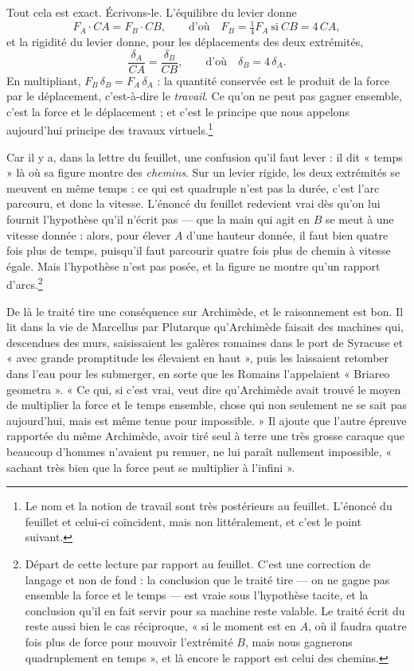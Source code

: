 \documentclass[11pt,a4paper]{article}
\begin{document}
Tout cela est exact. Écrivons-le. L'équilibre du levier donne
\[ F_A \cdot CA = F_B \cdot CB, \qquad \text{d'où} \quad F_B = \tfrac14 F_A \ \text{si} \ CB = 4\,CA, \]
et la rigidité du levier donne, pour les déplacements des deux extrémités,
\[ \frac{\delta_A}{CA} = \frac{\delta_B}{CB}, \qquad \text{d'où} \quad \delta_B = 4\,\delta_A. \]
En multipliant, $F_B\,\delta_B = F_A\,\delta_A$ : la quantité conservée est le
produit de la force par le déplacement, c'est-à-dire le \emph{travail}. Ce qu'on
ne peut pas gagner ensemble, c'est la force et le déplacement ; et c'est le
principe que nous appelons aujourd'hui principe des travaux
virtuels.\footnote{Le nom et la notion de travail sont très postérieurs au
feuillet. L'énoncé du feuillet et celui-ci coïncident, mais non littéralement, et
c'est le point suivant.}

Car il y a, dans la lettre du feuillet, une confusion qu'il faut lever : il dit
« temps » là où sa figure montre des \emph{chemins}. Sur un levier rigide, les
deux extrémités se meuvent en même temps : ce qui est quadruple n'est pas la
durée, c'est l'arc parcouru, et donc la vitesse. L'énoncé du feuillet redevient
vrai dès qu'on lui fournit l'hypothèse qu'il n'écrit pas — que la main qui agit
en $B$ se meut à une vitesse donnée : alors, pour élever $A$ d'une hauteur
donnée, il faut bien quatre fois plus de temps, puisqu'il faut parcourir quatre
fois plus de chemin à vitesse égale. Mais l'hypothèse n'est pas posée, et la
figure ne montre qu'un rapport d'arcs.\footnote{Départ de cette lecture par
rapport au feuillet. C'est une correction de langage et non de fond : la
conclusion que le traité tire — on ne gagne pas ensemble la force et le temps —
est vraie sous l'hypothèse tacite, et la conclusion qu'il en fait servir pour sa
machine reste valable. Le traité écrit du reste aussi bien le cas réciproque, « si
le moment est en $A$, où il faudra quatre fois plus de force pour mouvoir
l'extrémité $B$, mais nous gagnerons quadruplement en temps », et là encore le
rapport est celui des chemins.}

De là le traité tire une conséquence sur Archimède, et le raisonnement est bon.
Il lit dans la vie de Marcellus par Plutarque qu'Archimède faisait des machines
qui, descendues des murs, saisissaient les galères romaines dans le port de
Syracuse et « avec grande promptitude les élevaient en haut », puis les
laissaient retomber dans l'eau pour les submerger, en sorte que les Romains
l'appelaient « Briareo geometra ». « Ce qui, si c'est vrai, veut dire qu'Archimède
avait trouvé le moyen de multiplier la force et le temps ensemble, chose qui non
seulement ne se sait pas aujourd'hui, mais est même tenue pour impossible. » Il
ajoute que l'autre épreuve rapportée du même Archimède, avoir tiré seul à terre
une très grosse caraque que beaucoup d'hommes n'avaient pu remuer, ne lui paraît
nullement impossible, « sachant très bien que la force peut se multiplier à
l'infini ».
\end{document}
